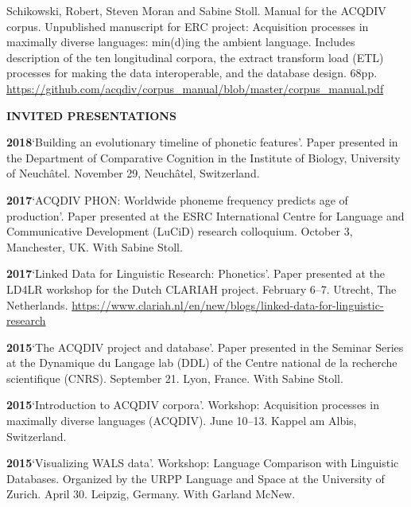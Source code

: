 \documentclass[11pt]{article}
\newcommand{\hangpara}{
 \setlength{\parindent}{0in} %
 \hangindent=0.42in %
}
\begin{document}
\vskip 6pt
\hangpara
Schikowski, Robert, Steven Moran and Sabine Stoll. Manual for the ACQDIV corpus. Unpublished manuscript for ERC project: Acquisition processes in maximally diverse languages: min(d)ing the ambient language. Includes description of the ten longitudinal corpora, the extract transform load (ETL) processes for making the data interoperable, and the database design. 68pp. \url{https://github.com/acqdiv/corpus_manual/blob/master/corpus_manual.pdf}

\vskip 20pt
\begin{flushleft}
{\bf INVITED PRESENTATIONS}
\end{flushleft}

\hangpara
{\bf 2018}\hspace{1ex}`Building an evolutionary timeline of phonetic features'. Paper presented in the Department of Comparative Cognition in the Institute of Biology, University of Neuchâtel. November 29, Neuchâtel, Switzerland.

\vskip 6pt
\hangpara
{\bf 2017}\hspace{1ex}`ACQDIV PHON: Worldwide phoneme frequency predicts age of production'. Paper presented at the ESRC International Centre for Language and Communicative Development (LuCiD) research colloquium. October 3, Manchester, UK. With Sabine Stoll.

\vskip 6pt
\hangpara
{\bf 2017}\hspace{1ex}`Linked Data for Linguistic Research: Phonetics'. Paper presented at the LD4LR workshop for the Dutch CLARIAH project. February 6--7. Utrecht, The Netherlands. \url{https://www.clariah.nl/en/new/blogs/linked-data-for-linguistic-research}

\vskip 6pt
\hangpara
{\bf 2015}\hspace{1ex}`The ACQDIV project and database'. Paper presented in the Seminar Series at the Dynamique du Langage lab (DDL) of the Centre national de la recherche scientifique (CNRS). September 21. Lyon, France. With Sabine Stoll.

\vskip 6pt
\hangpara
{\bf 2015}\hspace{1ex}`Introduction to ACQDIV corpora'. Workshop: Acquisition processes in maximally diverse languages (ACQDIV). June 10--13. Kappel am Albis, Switzerland.

\vskip 6pt
\hangpara
{\bf 2015}\hspace{1ex}`Visualizing WALS data'. Workshop: Language Comparison with Linguistic Databases. Organized by the URPP Language and Space at the University of Zurich. April 30. Leipzig, Germany. With Garland McNew.
\end{document}
